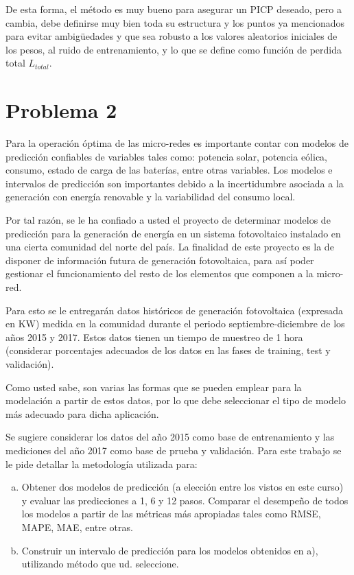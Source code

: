 \documentclass[12pt]{article}
\begin{document}
	De esta forma, el método es muy bueno para asegurar un PICP deseado, pero a cambia, debe definirse muy bien toda su estructura y los puntos ya mencionados para evitar ambigüedades y que sea robusto a los valores aleatorios iniciales de los pesos, al ruido de entrenamiento, y lo que se define como función de perdida total $L_{total}$.
\clearpage
\newpage
\section{Problema 2}
Para la operación óptima de las micro-redes es importante contar con modelos de predicción confiables de variables tales como: potencia solar, potencia eólica, consumo, estado de carga de las baterías, entre otras variables. Los modelos e intervalos de predicción son importantes debido a la incertidumbre asociada a la generación con energía renovable y la variabilidad del consumo local.

Por tal razón, se le ha confiado a usted el proyecto de determinar modelos de predicción para la generación de energía en un sistema fotovoltaico instalado en una cierta comunidad del norte del país. La finalidad de este proyecto es la de disponer de información futura de generación fotovoltaica, para así poder gestionar el funcionamiento del resto de los elementos que componen a la micro-red.

Para esto se le entregarán datos históricos de generación fotovoltaica (expresada en KW) medida en la comunidad durante el periodo septiembre-diciembre de los años 2015 y 2017. Estos datos tienen un tiempo de muestreo de 1 hora (considerar porcentajes adecuados de los datos en las fases de training, test y validación).

Como usted sabe, son varias las formas que se pueden emplear para la modelación a partir de estos datos, por lo que debe seleccionar el tipo de modelo más adecuado para dicha aplicación.

Se sugiere considerar los datos del año 2015 como base de entrenamiento y las mediciones del año 2017 como base de prueba y validación. Para este trabajo se le pide detallar la metodología utilizada para:

\begin{enumerate}[a)]
  \item Obtener dos modelos de predicción (a elección entre los vistos en este curso) y evaluar las predicciones a 1, 6 y 12 pasos. Comparar el desempeño de todos los modelos a partir de las métricas más apropiadas tales como RMSE, MAPE, MAE, entre otras.
  \item Construir un intervalo de predicción para los modelos obtenidos en a), utilizando método que ud. seleccione.
\end{enumerate}
\end{document}
